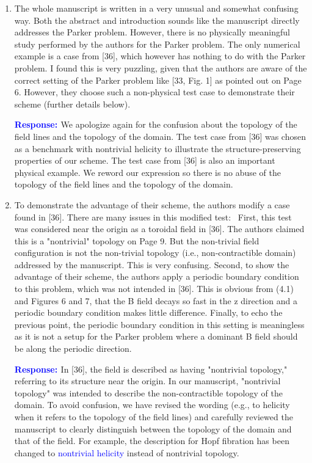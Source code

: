 \documentclass{article}
\theoremstyle{definition}
\newcommand{\rv}[1]{%
  \colorbox{gray!20}{%
    \parbox{0.96\linewidth}{%
      \small #1
    }%
  }%
}
\newcommand{\rp}{\textbf{\textcolor{blue}{Response: }}}
\newcommand{\blue}[1]{\textcolor{blue}{#1}}
\begin{document}
\begin{enumerate}
\item \rv{The whole manuscript is written in a very unusual and somewhat confusing way. Both the abstract and introduction sounds like the manuscript directly addresses the Parker problem. However, there is no physically meaningful study performed by the authors for the Parker problem. The only numerical example is a case from [36], which however has nothing to do with the Parker problem. I found this is very puzzling, given that the authors are aware of the correct setting of the Parker problem like [33, Fig. 1] as pointed out on Page 6. However, they choose such a non-physical test case to demonstrate their scheme (further details below).}

\rp We apologize again for the confusion about the topology of the field lines and the topology of the domain. The test case from [36] was chosen as a benchmark with nontrivial helicity to illustrate the structure-preserving properties of our scheme. The test case from [36] is also an important physical example. We reword our expression so there is no abuse of the topology of the field lines and the topology of the domain. 

\item \rv{To demonstrate the advantage of their scheme, the authors modify a case found in [36]. There are many issues in this modified test:   
First, this test was considered near the origin as a toroidal field in [36]. The authors claimed this is a "nontrivial" topology on Page 9. But the non-trivial field configuration is not the non-trivial topology (i.e., non-contractible domain) addressed by the manuscript. This is very confusing. Second, to show the advantage of their scheme, the authors apply a periodic boundary condition to this problem, which was not intended in [36]. This is obvious from (4.1) and Figures 6 and 7, that the B field decays so fast in the z direction and a periodic boundary condition makes little difference. Finally, to echo the previous point, the periodic boundary condition in this setting is meaningless as it is not a setup for the Parker problem where a dominant B field should be along the periodic direction.}

\rp In [36], the field is described as having "nontrivial topology," referring to its structure near the origin. In our manuscript, "nontrivial topology" was intended to describe the non-contractible topology of the domain. To avoid confusion, we have revised the wording (e.g., to helicity when it refers to the topology of the field lines) and carefully reviewed the manuscript to clearly distinguish between the topology of the domain and that of the field. For example, the description for Hopf fibration has been changed to \blue{nontrivial helicity} instead of nontrivial topology.


\end{enumerate}
\end{document}
